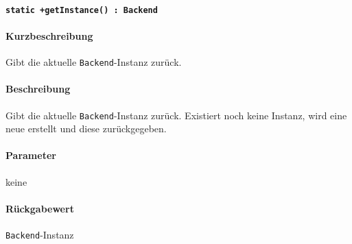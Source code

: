 \paragraph{\texttt{static +getInstance() : Backend}}%
\paragraph*{Kurzbeschreibung}
Gibt die aktuelle \verb#Backend#-Instanz zurück.
\paragraph*{Beschreibung}
Gibt die aktuelle \verb#Backend#-Instanz zurück.
Existiert noch keine Instanz, wird eine neue erstellt und diese zurückgegeben.
\paragraph*{Parameter}
keine
\paragraph*{Rückgabewert}
\verb#Backend#-Instanz